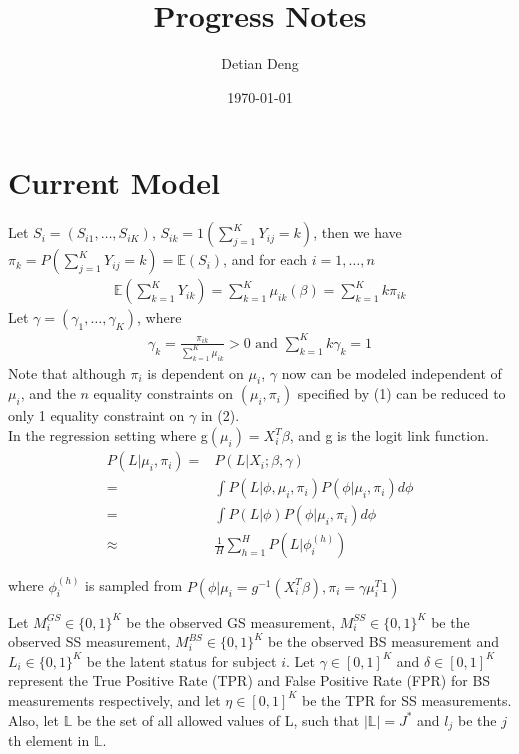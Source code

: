 \documentclass[11 pt, a4paper]{article}  %
\begin{document}
\title{Progress Notes}   %
\author{Detian Deng}         %
\date{\today}    %


\newpage
\section{Current Model}
Let $S_i = (S_{i1}, \ldots, S_{iK})$, $S_{ik} = 1(\sum_{j=1}^{K}Y_{ij}=k)$, then we have $\pi_k=P(\sum_{j=1}^{K}Y_{ij}=k) = \mathbb{E}(S_i)$, and for each $i = 1,\ldots, n$
\begin{align}
\mathbb{E}(\sum_{k=1}^{K}Y_{ik}) =\sum_{k=1}^K \mu_{ik}(\beta) = \sum_{k=1}^K k\pi_{ik}
\end{align}
Let $\gamma = (\gamma_1,\ldots, \gamma_K)$, where 
\begin{align}
\gamma_k = \frac{\pi_{ik}}{\sum_{k=1}^K \mu_{ik}}>0 \text{ and } \sum_{k=1}^K k\gamma_{k} = 1
\end{align}
Note that although $\pi_i$ is dependent on $\mu_i$, $\gamma$ now can be modeled independent of $\mu_i$, and the $n$ equality constraints on $(\mu_i, \pi_i)$ specified by (1) can be reduced to only 1 equality constraint on $\gamma$ in (2).\\

In the regression setting where g$(\mu_i)=X_i^T\beta$, and g is the logit link function.
\begin{align}
P(L | \mu_i, \pi_i) = & P(L | X_i; \beta, \gamma) \\
= & \int P(L | \phi, \mu_i, \pi_i) P(\phi | \mu_i,\pi_i) d \phi \nonumber \\ 
= & \int P(L | \phi) P(\phi | \mu_i,\pi_i) d \phi \nonumber \\ 
\approx & \frac{1}{H}\sum_{h=1}^H P(L | \phi_i^{(h)}) 
\end{align}

where $\phi_i^{(h)}$ is sampled from $P(\phi | \mu_i = g^{-1}(X_i^T\beta),\pi_i = \gamma \mu_i^T1)$


\newpage
Let $M_i^{GS} \in \{0,1\}^K$ be the observed GS measurement, $M_i^{SS} \in \{0,1\}^K$ be the observed SS measurement, $M_i^{BS} \in \{0,1\}^K$ be the observed BS measurement and $L_i \in \{0,1\}^K$ be the latent status for subject $i$. Let $\gamma \in [0,1]^K$ and $\delta \in [0,1]^K$ represent the True Positive Rate (TPR) and False Positive Rate (FPR) for BS measurements respectively, and let $\eta \in [0,1]^K$ be the TPR for SS measurements. Also, let $\mathbb{L}$ be the set of all allowed values of L, such that $|\mathbb{L}| = J^*$ and $l_j$ be the $j$th element in $\mathbb{L}$.
\end{document}

